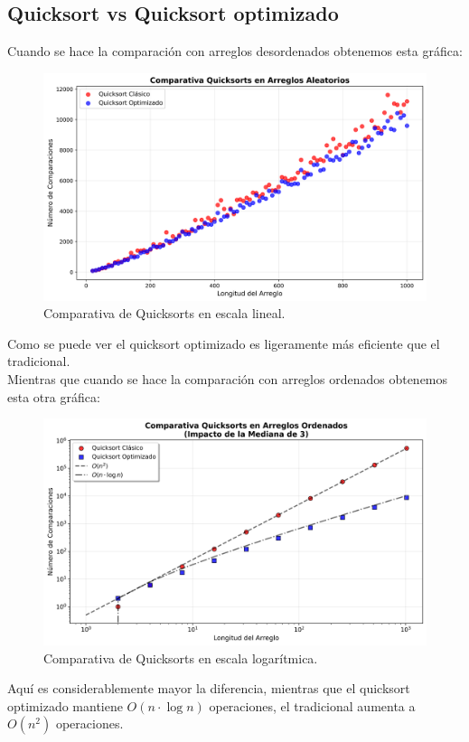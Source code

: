 \documentclass[conference]{IEEEtran}
\begin{document}
\subsection{Quicksort vs Quicksort optimizado}
Cuando se hace la comparación con arreglos desordenados obtenemos esta gráfica:
\begin{figure}[H]
    \centering
    \includegraphics[scale=0.35]{../Gráficas/Exp1A.png}
    \caption{Comparativa de Quicksorts en escala lineal.}\label{fig:exp1A}
\end{figure}
Como se puede ver el quicksort optimizado es ligeramente más eficiente que el tradicional.\\
Mientras que cuando se hace la comparación con arreglos ordenados obtenemos esta otra gráfica:

\begin{figure}[H]
    \centering
    \includegraphics[scale=0.35]{../Gráficas/Exp1B.png}
    \caption{Comparativa de Quicksorts en escala logarítmica.}\label{fig:exp1B}
\end{figure}
Aquí es considerablemente mayor la diferencia, mientras que el quicksort optimizado mantiene $O(n\cdot \log{n})$ operaciones, el tradicional aumenta a $O(n^2)$ operaciones.
\end{document}
